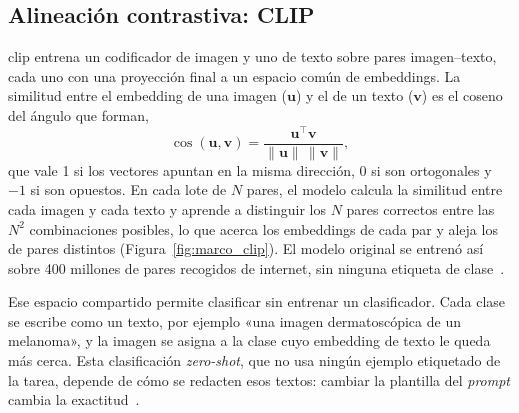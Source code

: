 \subsection{Alineación contrastiva: CLIP}
\label{sec:marco_vlm_clip}

\Gls{clip} entrena un codificador de imagen y uno de texto sobre pares imagen--texto, cada uno con una
proyección final a un espacio común de embeddings. La similitud entre el embedding de una imagen ($\mathbf{u}$)
y el de un texto ($\mathbf{v}$) es el coseno del ángulo que forman,
\begin{equation}
    \cos(\mathbf{u}, \mathbf{v}) = \frac{\mathbf{u}^{\top}\mathbf{v}}{\lVert\mathbf{u}\rVert\,\lVert\mathbf{v}\rVert},
    \label{eq:marco_cos}
\end{equation}
que vale 1 si los vectores apuntan en la misma dirección, 0 si son ortogonales y $-1$ si son opuestos. En cada
lote de $N$ pares, el modelo calcula la similitud entre cada imagen y cada texto y aprende a distinguir los $N$
pares correctos entre las $N^2$ combinaciones posibles, lo que acerca los embeddings de cada par y aleja los de
pares distintos (Figura~\ref{fig:marco_clip}). El modelo original se entrenó así sobre 400 millones de pares
recogidos de internet, sin ninguna etiqueta de clase~\cite{radford2021learning}.



Ese espacio compartido permite clasificar sin entrenar un clasificador. Cada clase se escribe como un
texto, por ejemplo «una imagen dermatoscópica de un melanoma», y la imagen se asigna a la clase cuyo
embedding de texto le queda más cerca. Esta clasificación \emph{zero-shot}, que no usa ningún ejemplo
etiquetado de la tarea, depende de cómo se redacten esos textos: cambiar la plantilla del \emph{prompt}
cambia la exactitud~\cite{radford2021learning}.

